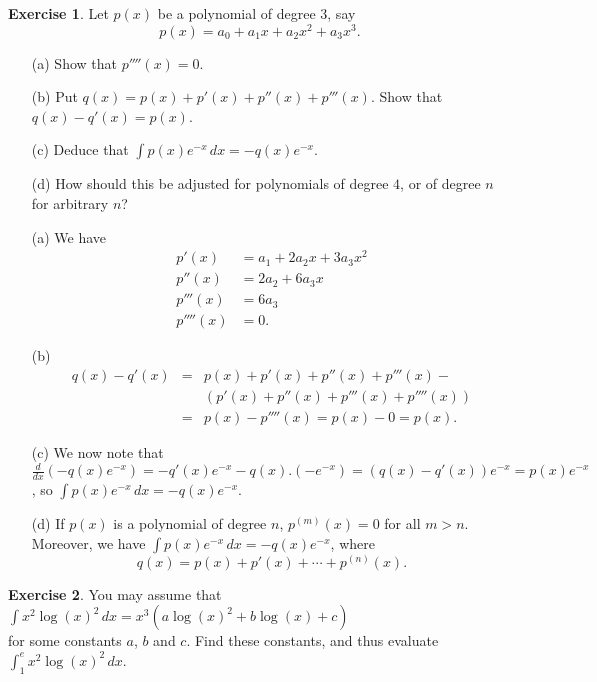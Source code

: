 \documentclass[a4paper]{amsart}
\theoremstyle{definition}
\newtheorem{exercise}{Exercise}[section]
\newenvironment{solution}{{\noindent \bf Solution:}}{}
\begin{document}
\begin{exercise}\label{ex-int-poly-exp-gen}
Let $p(x)$ be a polynomial of degree $3$, say 
 \[ p(x) = a_0 + a_1x + a_2x^2 + a_3x^3. \]
 \begin{itemize}
  \item[(a)] Show that $p''''(x)=0$.
  \item[(b)] Put $q(x)=p(x)+p'(x)+p''(x)+p'''(x)$.  Show that
   $q(x)-q'(x)=p(x)$.
  \item[(c)] Deduce that $\int p(x)e^{-x}\,dx=-q(x)e^{-x}$.
  \item[(d)] How should this be adjusted for polynomials of degree
   $4$, or of degree $n$ for arbitrary $n$?
 \end{itemize}
\end{exercise}
\begin{solution}
\begin{itemize}
  \item[(a)] We have
   \begin{align*}
    p'(x) &= a_1+2a_2x+3a_3x^2 \\
    p''(x) &= 2a_2+6a_3x \\
    p'''(x) &= 6a_3 \\
    p''''(x) &= 0.
   \end{align*}
  \item[(b)] 
   \begin{eqnarray*}
    q(x) - q'(x) &=& p(x) + p'(x) + p''(x) + p'''(x) - \\
                 &&  (p'(x) + p''(x) + p'''(x) + p''''(x)) \\
                 &=& p(x) - p''''(x) = p(x) - 0 = p(x).
   \end{eqnarray*}
  \item[(c)] We now note that
   $\displaystyle 
    \frac{d}{dx}(-q(x)e^{-x}) = -q'(x)e^{-x} - q(x).(-e^{-x})
     = (q(x)-q'(x))e^{-x} = p(x)e^{-x}$,
   so $\int p(x)e^{-x}\,dx=-q(x)e^{-x}$.
  \item[(d)] If $p(x)$ is a polynomial of degree $n$, $p^{(m)}(x)=0$
   for all $m>n$.  Moreover, we have 
   $\int p(x)e^{-x}\,dx=-q(x)e^{-x}$, where
   \[ q(x) = p(x) + p'(x) + \dotsb + p^{(n)}(x). \]
 \end{itemize}
\end{solution}
\begin{exercise}\label{ex-int-poly-log-ii}
You may assume that
  $\displaystyle \int x^2 \log(x)^2\,dx = x^3(a\log(x)^2 + b\log(x) + c)$\\
  for some constants $a$, $b$ and $c$.  Find these constants, and thus
  evaluate $\int_1^e x^2\log(x)^2\, dx$.
\end{exercise}
\end{document}
